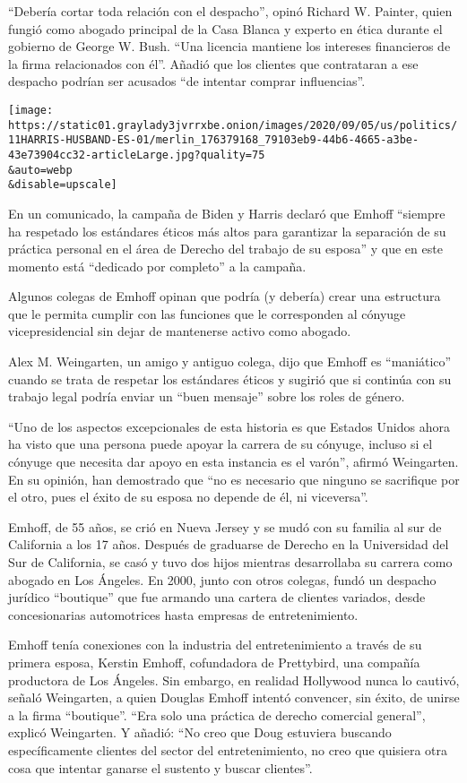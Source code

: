 ``Debería cortar toda relación con el despacho'', opinó Richard W.
Painter, quien fungió como abogado principal de la Casa Blanca y experto
en ética durante el gobierno de George W. Bush. ``Una licencia mantiene
los intereses financieros de la firma relacionados con él''. Añadió que
los clientes que contrataran a ese despacho podrían ser acusados ``de
intentar comprar influencias''.

\texttt{[image: https://static01.graylady3jvrrxbe.onion/images/2020/09/05/us/politics/11HARRIS-HUSBAND-ES-01/merlin\_176379168\_79103eb9-44b6-4665-a3be-43e73904cc32-articleLarge.jpg?quality=75\\\&auto=webp\\\&disable=upscale]}

En un comunicado, la campaña de Biden y Harris declaró que Emhoff
``siempre ha respetado los estándares éticos más altos para garantizar
la separación de su práctica personal en el área de Derecho del trabajo
de su esposa'' y que en este momento está ``dedicado por completo'' a la
campaña.

Algunos colegas de Emhoff opinan que podría (y debería) crear una
estructura que le permita cumplir con las funciones que le corresponden
al cónyuge vicepresidencial sin dejar de mantenerse activo como abogado.

Alex M. Weingarten, un amigo y antiguo colega, dijo que Emhoff es
``maniático'' cuando se trata de respetar los estándares éticos y
sugirió que si continúa con su trabajo legal podría enviar un ``buen
mensaje'' sobre los roles de género.

``Uno de los aspectos excepcionales de esta historia es que Estados
Unidos ahora ha visto que una persona puede apoyar la carrera de su
cónyuge, incluso si el cónyuge que necesita dar apoyo en esta instancia
es el varón'', afirmó Weingarten. En su opinión, han demostrado que ``no
es necesario que ninguno se sacrifique por el otro, pues el éxito de su
esposa no depende de él, ni viceversa''.

Emhoff, de 55 años, se crió en Nueva Jersey y se mudó con su familia al
sur de California a los 17 años. Después de graduarse de Derecho en la
Universidad del Sur de California, se casó y tuvo dos hijos mientras
desarrollaba su carrera como abogado en Los Ángeles. En 2000, junto con
otros colegas, fundó un despacho jurídico ``boutique'' que fue armando
una cartera de clientes variados, desde concesionarias automotrices
hasta empresas de entretenimiento.

Emhoff tenía conexiones con la industria del entretenimiento a través de
su primera esposa, Kerstin Emhoff, cofundadora de Prettybird, una
compañía productora de Los Ángeles. Sin embargo, en realidad Hollywood
nunca lo cautivó, señaló Weingarten, a quien Douglas Emhoff intentó
convencer, sin éxito, de unirse a la firma ``boutique''. ``Era solo una
práctica de derecho comercial general'', explicó Weingarten. Y añadió:
``No creo que Doug estuviera buscando específicamente clientes del
sector del entretenimiento, no creo que quisiera otra cosa que intentar
ganarse el sustento y buscar clientes''.

